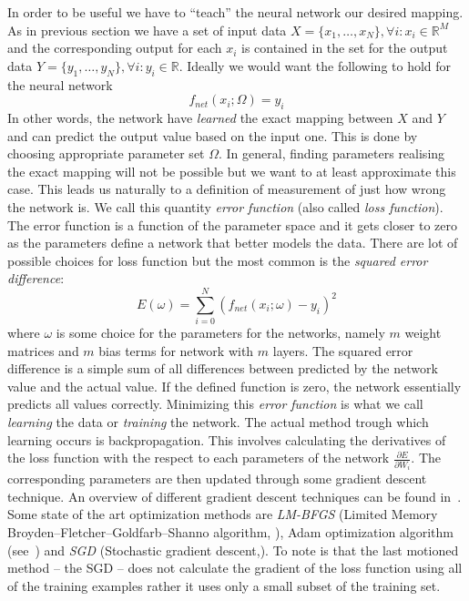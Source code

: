 \documentclass[12pt,a4paper,twoside]{scrartcl}
\numberwithin{equation}{section}
\begin{document}
In order to be useful we have to ``teach'' the neural network our desired mapping. As in previous section we have a set of input data \(X = \{x_1,\ldots , x_N\}, \forall i : x_i\in\mathbb{R}^M\) and the corresponding output for each \(x_i\) is contained in the set for the output data \(Y = \{y_1,\ldots ,y_N\}, \forall i : y_i\in\mathbb{R}\). Ideally we would want the following to hold for the neural network
\begin{equation}
  f_{net}(x_i;\Omega) = y_i
\end{equation}
In other words, the network have \emph{learned} the exact mapping between \(X\) and \(Y\) and can predict the output value based on the input one. This is done by choosing appropriate parameter set \(\Omega\). In general, finding parameters realising the exact mapping will not be possible but we want to at least approximate this case. This leads us naturally to a definition of measurement of just how wrong the network is. We call this quantity \emph{error function} (also called \emph{loss function}). The error function is a function of the parameter space and it gets closer to zero as the parameters define a network that better models the data. There are lot of possible choices for loss function but the most common is the \emph{squared error difference}:
\begin{equation}
  E(\omega) =  \sum_{i=0}^N (f_{net}(x_i;\omega) - y_i)^2
\end{equation}
where \(\omega\) is some choice for the parameters for the networks, namely \(m\) weight matrices and \(m\) bias terms for network with \(m\) layers. The squared error difference is a simple sum of all differences between predicted by the network value and the actual value. If the defined function is zero, the network essentially predicts all values correctly. Minimizing this \emph{error function} is what we call \emph{learning} the data or \emph{training} the network. The actual method trough which learning occurs is backpropagation. This involves calculating the derivatives of the loss function with the respect to each parameters of the network \(\frac{\partial E}{\partial W_i }\). The corresponding parameters are then updated through some gradient descent technique. An overview of different gradient descent techniques can be found in~\cite{ruder2016}. Some state of the art optimization methods are \emph{LM-BFGS} (Limited Memory Broyden–Fletcher–Goldfarb–Shanno algorithm, \cite{byrd1995}), Adam optimization algorithm (see~\cite{kingma2014}) and \emph{SGD} (Stochastic gradient descent,\cite{robbins1951}). To note is that the last motioned method -- the SGD -- does not calculate the gradient of the loss function using all of the training examples rather it uses only a small subset of the training set.
\end{document}
